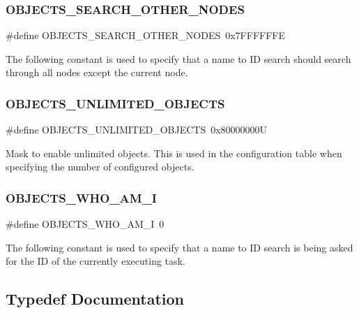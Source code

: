 \subsubsection{\texorpdfstring{OBJECTS\_SEARCH\_OTHER\_NODES}{OBJECTS\_SEARCH\_OTHER\_NODES}}
{\footnotesize\ttfamily \#define O\+B\+J\+E\+C\+T\+S\+\_\+\+S\+E\+A\+R\+C\+H\+\_\+\+O\+T\+H\+E\+R\+\_\+\+N\+O\+D\+ES~0x7\+F\+F\+F\+F\+F\+FE}

The following constant is used to specify that a name to ID search should search through all nodes except the current node. \mbox{\label{group__RTEMSScoreObject_ga2e39d2184f4f29e069ff679d9be47040}} 
\subsubsection{\texorpdfstring{OBJECTS\_UNLIMITED\_OBJECTS}{OBJECTS\_UNLIMITED\_OBJECTS}}
{\footnotesize\ttfamily \#define O\+B\+J\+E\+C\+T\+S\+\_\+\+U\+N\+L\+I\+M\+I\+T\+E\+D\+\_\+\+O\+B\+J\+E\+C\+TS~0x80000000U}

Mask to enable unlimited objects. This is used in the configuration table when specifying the number of configured objects. \mbox{\label{group__RTEMSScoreObject_ga6fd7ff36e6d951ff7cf435e9a7cdf359}} 
\subsubsection{\texorpdfstring{OBJECTS\_WHO\_AM\_I}{OBJECTS\_WHO\_AM\_I}}
{\footnotesize\ttfamily \#define O\+B\+J\+E\+C\+T\+S\+\_\+\+W\+H\+O\+\_\+\+A\+M\+\_\+I~0}

The following constant is used to specify that a name to ID search is being asked for the ID of the currently executing task. 

\subsection{Typedef Documentation}
\mbox{\label{group__RTEMSScoreObject_ga5821f52a51072941bdd603e542d0863e}} 
